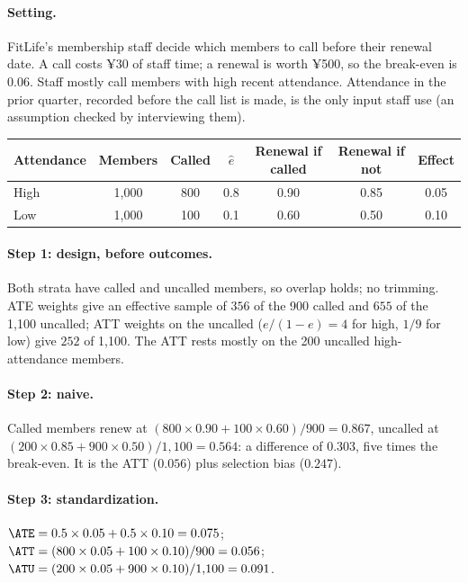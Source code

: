 \documentclass[11pt]{article}
\begin{document}
\paragraph{Setting.} FitLife's membership staff decide which members to call before their renewal date. A call costs ¥30 of staff
time; a renewal is worth ¥500, so the break-even is $0.06$. Staff mostly call members with high recent attendance. Attendance in
the prior quarter, recorded before the call list is made, is the only input staff use (an assumption checked by interviewing them).
\begin{center}
\begin{tabular}{lcccccc}
\toprule
Attendance & Members & Called & $\hat e$ & Renewal if called & Renewal if not & Effect \\
\midrule
High & 1{,}000 & 800 & 0.8 & 0.90 & 0.85 & 0.05 \\
Low  & 1{,}000 & 100 & 0.1 & 0.60 & 0.50 & 0.10 \\
\bottomrule
\end{tabular}
\end{center}

\paragraph{Step 1: design, before outcomes.} Both strata have called and uncalled members, so overlap holds; no trimming. ATE
weights give an effective sample of $356$ of the 900 called and $655$ of the 1{,}100 uncalled; ATT weights on the uncalled
($e/(1-e) = 4$ for high, $1/9$ for low) give $252$ of 1{,}100. The ATT rests mostly on the 200 uncalled high-attendance members.

\paragraph{Step 2: naive.} Called members renew at $(800 \times 0.90 + 100 \times 0.60)/900 = 0.867$, uncalled at
$(200 \times 0.85 + 900 \times 0.50)/1{,}100 = 0.564$: a difference of $0.303$, five times the break-even. It is the ATT ($0.056$) plus
selection bias ($0.247$).

\paragraph{Step 3: standardization.} $\ATE = 0.5 \times 0.05 + 0.5 \times 0.10 = 0.075$;
$\ATT = (800 \times 0.05 + 100 \times 0.10)/900 = 0.056$; $\ATU = (200 \times 0.05 + 900 \times 0.10)/1{,}100 = 0.091$.
\end{document}
